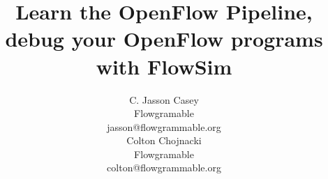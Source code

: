 \documentclass[conference]{sig-alternate}
\begin{document}
\title{Learn the OpenFlow Pipeline, debug your OpenFlow programs with FlowSim}

\author{
  \alignauthor C. Jasson Casey \\
  \affaddr Flowgramable \\
  \email jasson@flowgrammable.org \\
  \alignauthor Colton Chojnacki \\
  \affaddr Flowgramable \\
  \email colton@flowgrammable.org \\
}

\maketitle

\begin{abstract}
  
\end{abstract}

  
  
  
  
  
  
  
  
\end{document}
